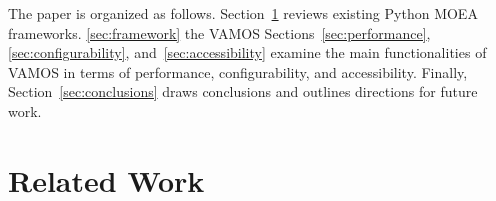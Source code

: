 \documentclass[final,5p,times,twocolumn]{elsarticle}
\begin{document}
The paper is organized as follows. Section~\ref{sec:related} reviews existing Python MOEA frameworks. \ref{sec:framework}  the VAMOS  Sections~\ref{sec:performance}, \ref{sec:configurability}, and~\ref{sec:accessibility} examine the main functionalities of VAMOS in terms of performance, configurability, and accessibility.  Finally, Section~\ref{sec:conclusions} draws conclusions and outlines directions for future work.

\section{Related Work} \label{sec:related}
\end{document}
